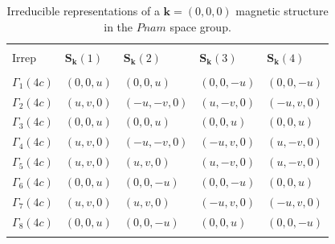 \documentclass[prb,aps,twocolumn,superscriptaddress,showpacs,footinbib]{revtex4-2}
\begin{document}
\begin{table}[!h]
\caption{Irreducible representations of a $\mathbf{k}=(0,0,0)$ magnetic structure in the $Pnam$ space group.}
\centering
\begin{tabular}{ p{1cm}p{1.5cm}p{1.7cm}p{1.7cm}p{1.7cm} }
\hline
\vspace{0.1mm} & \vspace{0.1mm} & \vspace{0.1mm} & \vspace{0.1mm} & \vspace{0.1mm}\\
Irrep & $\mathbf{S_{k}}(1)$ & $\mathbf{S_{k}}(2)$ & $\mathbf{S_{k}}(3)$ & $\mathbf{S_{k}}(4)$ \\
\hline
\vspace{0.1mm} & \vspace{0.1mm} & \vspace{0.1mm} & \vspace{0.1mm} & \vspace{0.1mm}\\
$\Gamma_{1}(4c)$ & $(0,0,u)$ & $(0,0,u)$ & $(0,0,-u)$ & $(0,0,-u)$\\
$\Gamma_{2}(4c)$ & $(u,v,0)$ & $(-u,-v,0)$ & $(u,-v,0)$ & $(-u,v,0)$\\
$\Gamma_{3}(4c)$ & $(0,0,u)$ & $(0,0,u)$ & $(0,0,u)$ & $(0,0,u)$\\
$\Gamma_{4}(4c)$ & $(u,v,0)$ & $(-u,-v,0)$ & $(-u,v,0)$ & $(u,-v,0)$\\
$\Gamma_{5}(4c)$ & $(u,v,0)$ & $(u,v,0)$ & $(u,-v,0)$ & $(u,-v,0)$\\
$\Gamma_{6}(4c)$ & $(0,0,u)$ & $(0,0,-u)$ & $(0,0,-u)$ & $(0,0,u)$\\
$\Gamma_{7}(4c)$ & $(u,v,0)$ & $(u,v,0)$ & $(-u,v,0)$ & $(-u,v,0)$\\
$\Gamma_{8}(4c)$ & $(0,0,u)$ & $(0,0,-u)$ & $(0,0,u)$ & $(0,0,-u)$\\
\hline
\vspace{0.1mm} & \vspace{0.1mm} & \vspace{0.1mm} & \vspace{0.1mm} & \vspace{0.1mm}\\
\end{tabular}
\label{tab:irreps_pnam}
\end{table}
\end{document}
